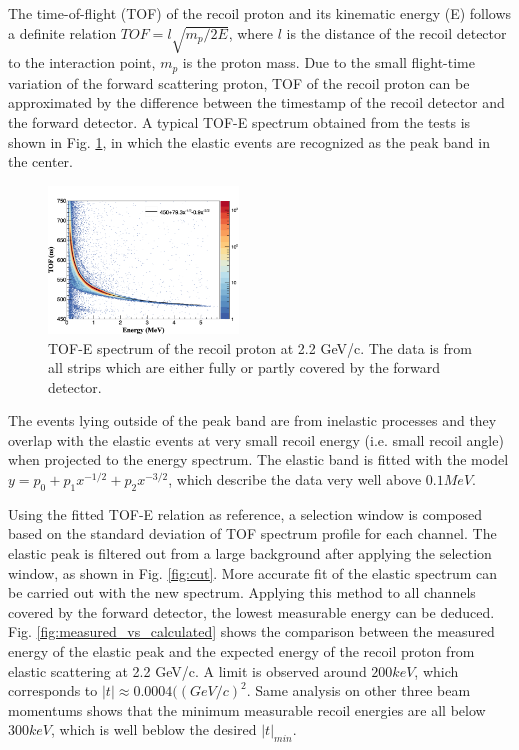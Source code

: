 \documentclass[number,5p]{elsarticle}
\begin{document}
The time-of-flight (TOF) of the recoil proton and its kinematic energy (E)
follows a definite relation $TOF = l\sqrt{m_p/2E}$, where $l$ is the distance of
the recoil detector to the interaction point, $m_p$ is the proton mass.
Due to the small flight-time variation of the forward scattering proton, TOF of the recoil proton can be approximated by the difference
between the timestamp of the recoil detector and the forward detector.
A typical TOF-E spectrum obtained from the tests is shown in Fig. \ref{fig:tof-e}, in which the elastic
events are recognized as the peak band in the center.
\begin{figure}[h!]
  \centering
  \includegraphics[width=0.45\textwidth]{./tof_e_cut.png}
  \caption{
    TOF-E spectrum of the recoil proton at 2.2 GeV/c. The data is from all
    strips which are either fully or partly covered by the forward detector.}
  \label{fig:tof-e}
\end{figure}
The events lying outside of the peak band are from inelastic processes and
they overlap with the elastic events at very small recoil energy (i.e. small recoil angle) when projected to the energy spectrum.
The elastic band is fitted with the model $y = p_{0} + p_{1}x^{-1/2} + p_{2}x^{-3/2}$,
which describe the data very well above $0.1 MeV$.

Using the fitted TOF-E relation as reference, a selection window is composed
based on the standard deviation of TOF spectrum profile for each channel.
The elastic peak is filtered out from a large background after applying the selection window, as shown in Fig. \ref{fig:cut}.
More accurate fit of the elastic spectrum can be carried out with the new spectrum.
Applying this method to all channels covered by the forward detector, the lowest
measurable energy can be deduced.
Fig. \ref{fig:measured_vs_calculated} shows the comparison between the measured
energy of the elastic peak and the expected energy of the recoil proton from elastic scattering at 2.2 GeV/c.
A limit is observed around \(200 keV\), which corresponds to $|t| \approx  0.0004  ((GeV/c)^2$.
Same analysis on other three beam momentums shows that the minimum measurable
recoil energies are all below $300 keV$, which is well beblow the desired $|t|_{min}$.
\end{document}
